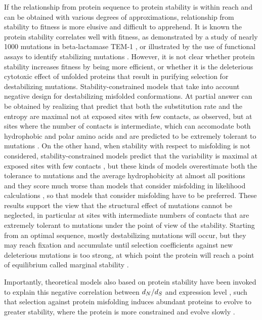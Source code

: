 If the relationship from protein sequence to protein stability is within reach and can be obtained with various degrees of approximations, relationship from stability to fitness is more elusive and difficult to apprehend.
It is known the protein stability correlates well with fitness, as demonstrated by a study of nearly 1000 mutations in beta-lactamase TEM-1 \citep{Jacquier2013}, or illustrated by the use of functional assays to identify stabilizing mutations \citep{Araya2012}.
However, it is not clear whether protein stability increases fitness by being more efficient, or whether it is the deleterious cytotoxic effect of unfolded proteins that result in purifying selection for destabilizing mutations.
Stability-constrained models that take into account negative design for destabilizing misfolded conformations.
At partial answer can be obtained by realizing that  \citep{Berezovsky2007, Noivirt-Brik2009, Minning2013} predict that both the substitution rate and the entropy are maximal not at exposed sites with few contacts, as observed, but at sites where the number of contacts is intermediate, which can accomodate both hydrophobic and polar amino acids and are predicted to be extremely tolerant to mutations \citep{Jimenez2018}.
On the other hand, when stability with respect to misfolding is not considered, stability-constrained models predict that the variability is maximal at exposed sites with few contacts \cite{Scherrer2012,Echave2015}, but these kinds of models overestimate both the tolerance to mutations and the average hydrophobicity at almost all positions \citep{Jimenez2018} and they score much worse than models that consider misfolding in \gls{likelihood} calculations \citep{Arenas2015a, Arenas2017}, so that models that consider misfolding have to be preferred.
These results support the view that the structural effect of mutations cannot be neglected, in particular at sites with intermediate numbers of contacts that are extremely tolerant to mutations under the point of view of the stability.
Starting from an optimal sequence, mostly destabilizing mutations will occur, but they may reach fixation and accumulate until selection coefficients against new deleterious mutations is too strong, at which point the protein will reach a point of equilibrium called marginal stability \citep{Taverna2002, Bloom2007}.

Importantly, theoretical models also based on protein stability have been invoked to explain this negative correlation between $d_N / d_S$ and expression level \citep{Wilke2006, Drummond2008}, such that selection against protein misfolding induces abundant proteins to evolve to greater stability, where the protein is more constrained and evolve slowly \citep{Serohijos2012}.

